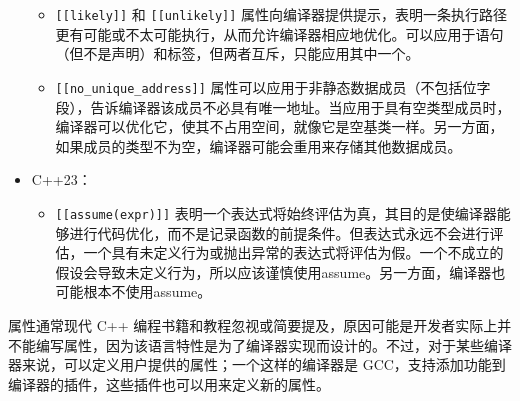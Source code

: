 \begin{itemize}
\begin{itemize}
\item
\verb|[[likely]]| 和 \verb|[[unlikely]]| 属性向编译器提供提示，表明一条执行路径更有可能或不太可能执行，从而允许编译器相应地优化。可以应用于语句（但不是声明）和标签，但两者互斥，只能应用其中一个。

\item
\verb|[[no_unique_address]]| 属性可以应用于非静态数据成员（不包括位字段），告诉编译器该成员不必具有唯一地址。当应用于具有空类型成员时，编译器可以优化它，使其不占用空间，就像它是空基类一样。另一方面，如果成员的类型不为空，编译器可能会重用来存储其他数据成员。
\end{itemize}

\item
C++23：

\begin{itemize}
\item
\verb|[[assume(expr)]]| 表明一个表达式将始终评估为真，其目的是使编译器能够进行代码优化，而不是记录函数的前提条件。但表达式永远不会进行评估，一个具有未定义行为或抛出异常的表达式将评估为假。一个不成立的假设会导致未定义行为，所以应该谨慎使用assume。另一方面，编译器也可能根本不使用assume。
\end{itemize}

\end{itemize}

属性通常现代 C++ 编程书籍和教程忽视或简要提及，原因可能是开发者实际上并不能编写属性，因为该语言特性是为了编译器实现而设计的。不过，对于某些编译器来说，可以定义用户提供的属性；一个这样的编译器是 GCC，支持添加功能到编译器的插件，这些插件也可以用来定义新的属性。

